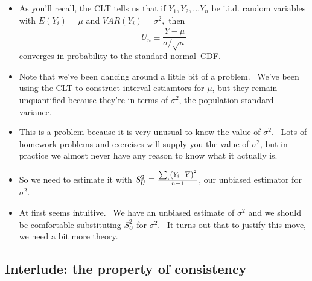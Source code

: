 \documentclass[11pt]{article}
\begin{document}
\begin{itemize}
\item As you'll recall, the CLT tells us that if $Y_{1},Y_{2},...Y_{n}$ be
i.i.d. random variables with $E(Y_{i})=\mu $ and $VAR(Y_{i})=\sigma ^{2},$%
then%
\begin{equation*}
U_{n}\equiv \frac{\overline{Y}-\mu }{\sigma /\sqrt{n}}
\end{equation*}%
converges in probability to the standard normal\ CDF.

\item Note that we've been dancing around a little bit of a problem. \ We've
been using the CLT to construct interval estiamtors for $\mu $, but they
remain unquantified because they're in terms of $\sigma ^{2}$, the
population standard variance. \ 

\item This is a problem because it is very unusual to know the value of $%
\sigma ^{2}.$ \ Lots of homework problems and exercises will supply you the
value of $\sigma ^{2}$, but in practice we almost never have any reason to
know what it actually is.

\item So we need to estimate it with $S_{U}^{2}\equiv \frac{%
\sum\nolimits_{i}\left( Y_{i}-\overline{Y}\right) ^{2}}{n-1}$, our unbiased
estimator for $\sigma ^{2}.$ \ 

\item At first seems intuitive. \ We have an unbiased estimate of $\sigma
^{2}$ and we should be comfortable substituting $S_{U}^{2}$ for $\sigma
^{2}. $ \ It turns out that to justify this move, we need a bit more theory.
\end{itemize}

\subsection{Interlude: the property of consistency}
\end{document}

